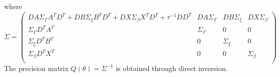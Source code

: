\documentclass[serif,10pt]{wiley-article}
\begin{document}
where
\begin{equation*}
\Sigma = \begin{pmatrix}
DA\Sigma_{\Gamma}A^{T}D^{T} + DB\Sigma_{\xi}B^{T}D^{T} + DX\Sigma_{\beta}X^{T}D^{T} + \tau^{-1}DD^{T} & DA\Sigma_{\Gamma} & DB\Sigma_{\xi} & DX\Sigma_{\beta} \\
\Sigma_{\Gamma}D^{T}A^{T} & \Sigma_{\Gamma} & 0 & 0 \\
\Sigma_{\xi}D^{T}B^{T} & 0 & \Sigma_{\xi} & 0 \\
\Sigma_{\beta}D^{T}X^{T} & 0 & 0 & \Sigma_{\beta} \\
\end{pmatrix}
\end{equation*}
The precision matrix $Q(\theta) = \Sigma^{-1}$ is obtained through direct inversion.


\nocite{*}%
%


\clearpage
\begin{table}
\centering
{}

\caption{Estimated means and standard deviations of linear effects by proposed method, frequentist partial likelihood maximization method (Freq PL) and INLA, for the kidney data in section \ref{subsec:kidney}.}
\label{table:KidneyFixed}
\end{table}
\end{document}
